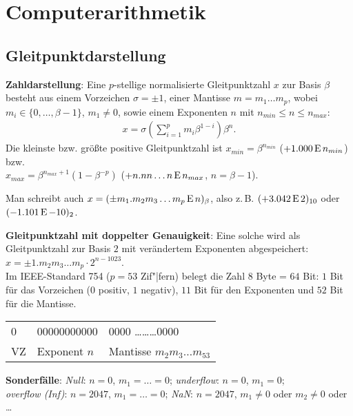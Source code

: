 \section{%
    Computerarithmetik%
}

\subsection{%
    Gleitpunktdarstellung%
}

\textbf{Zahldarstellung}:
Eine $p$-stellige normalisierte Gleitpunktzahl $x$ zur Basis $\beta$
besteht aus einem Vorzeichen $\sigma = \pm 1$,
einer Mantisse $m = m_1 \dotsc m_p$, wobei
$m_i \in \{0, \ldots, \beta - 1\}$, $m_1 \not= 0$,
sowie einem Exponenten $n$ mit $n_{min} \le n \le n_{max}$:
\begin{align*}
    x = \sigma \left(\sum_{i=1}^p m_i \beta^{1-i}\right) \beta^n.
\end{align*}
Die kleinste bzw. größte positive Gleitpunktzahl ist
$x_{min} = \beta^{n_{min}}$ ($+1.000 \operatorname{E} n_{min}$) bzw. \\
$x_{max} = \beta^{n_{max}+1} (1 - \beta^{-p})$
($+n.nn \dotsc n \operatorname{E} n_{max}$, $n = \beta - 1$).

Man schreibt auch $x = (\pm m_1 . m_2 m_3 \ldots m_p \operatorname{E} n)_\beta$,
also z.\,B. $(+3.042 \operatorname{E} 2)_{10}$ oder $(-1.101 \operatorname{E} -10)_2$.

\linie

\textbf{Gleitpunktzahl mit doppelter Genauigkeit}:
Eine solche wird als Gleitpunktzahl zur Basis $2$ mit verändertem Exponenten
abgespeichert: $x = \pm 1 . m_2 m_3 \ldots m_p \cdot 2^{n-1023}$. \\
Im IEEE-Standard 754 ($p = 53$ Zif"|fern) belegt die Zahl $8$ Byte = $64$ Bit:
$1$ Bit für das Vorzeichen ($0$ positiv, $1$ negativ),
$11$ Bit für den Exponenten und $52$ Bit für die Mantisse.

\begin{center}
    \begin{tabular}{l|l|l}
        0 & 00000000000 & 0000 \dots \dots \dots 0000 \\
        VZ & Exponent $n$ & Mantisse $m_2 m_3 \dotsc m_{53}$
    \end{tabular}
\end{center}

\textbf{Sonderfälle}: \qquad
\emph{Null}: $n = 0$, $m_1 = \ldots = 0$; \qquad
\emph{underflow}: $n = 0$, $m_1 = 0$; \\
\emph{overflow (Inf)}: $n = 2047$, $m_1 = \ldots = 0$; \qquad
\emph{NaN}: $n = 2047$, $m_1 \not= 0$ oder $m_2 \not= 0$ oder \ldots

